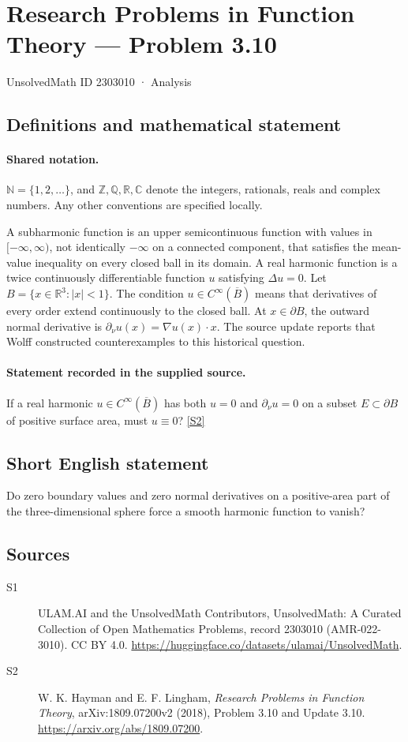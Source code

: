\documentclass[11pt]{article}
\newcommand{\sref}[2]{\hyperlink{source:#1:#2}{[S#2]}}
\begin{document}
\setcounter{section}{2303009}
\section{Research Problems in Function Theory — Problem 3.10}\label{2303010}
{\small\sffamily UnsolvedMath ID 2303010 · Analysis}
\subsection{Definitions and mathematical statement}

\paragraph{Shared notation.}$\mathbb N=\{1,2,\ldots\}$, and $\mathbb Z,\mathbb Q,\mathbb R,\mathbb C$ denote the integers, rationals, reals and complex numbers. Any other conventions are specified locally.


A subharmonic function is an upper semicontinuous function with values in $[-\infty,\infty)$, not identically $-\infty$ on a connected component, that satisfies the mean-value inequality on every closed ball in its domain. A real harmonic function is a twice continuously differentiable function $u$ satisfying $\Delta u=0$. Let $B=\{x\in\mathbb R^3:|x|<1\}$. The condition $u\in C^\infty(\overline B)$ means that derivatives of every order extend continuously to the closed ball. At $x\in\partial B$, the outward normal derivative is $\partial_\nu u(x)=\nabla u(x)\cdot x$.
The source update reports that Wolff constructed counterexamples to this historical question.
\paragraph{Statement recorded in the supplied source.}
If a real harmonic $u\in C^\infty(\overline B)$ has both $u=0$ and $\partial_\nu u=0$ on a subset $E\subset\partial B$ of positive surface area, must $u\equiv0$? \sref{2303010}{2}
\subsection{Short English statement}
Do zero boundary values and zero normal derivatives on a positive-area part of the three-dimensional sphere force a smooth harmonic function to vanish?
\subsection{Sources}
\begin{description}
\item[\hypertarget{source:2303010:1}{S1}] ULAM.AI and the UnsolvedMath Contributors, UnsolvedMath: A Curated Collection of Open Mathematics Problems, record 2303010 (AMR-022-3010). CC BY 4.0. \url{https://huggingface.co/datasets/ulamai/UnsolvedMath}.
\item[\hypertarget{source:2303010:2}{S2}] W. K. Hayman and E. F. Lingham, \emph{Research Problems in Function Theory}, arXiv:1809.07200v2 (2018), Problem 3.10 and Update 3.10. \url{https://arxiv.org/abs/1809.07200}.
\end{description}
\label{end:2303010}
\end{document}
